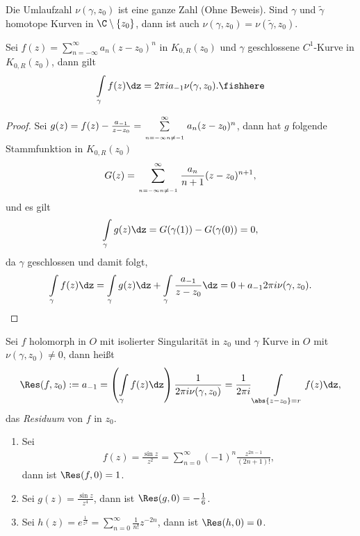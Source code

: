 \begin{bem}
\label{bem:2.87}
Die Umlaufzahl $\nu(\gamma,z_0)$ ist eine ganze Zahl (Ohne Beweis). Sind
$\gamma$ und $\tilde{\gamma}$ homotope Kurven in $\C\setminus\{z_0\}$, dann ist
auch $\nu(\gamma,z_0)=\nu(\tilde{\gamma},z_0)$.\maphere
\end{bem}

\begin{prop}
\label{prop:2.88}
Sei $f(z)=\sum\limits_{n=-\infty}^\infty a_n (z-z_0)^n$ in $K_{0,R}(z_0)$ und
$\gamma$ geschlossene $C^1$-Kurve in $K_{0,R}(z_0)$, dann gilt
\begin{align*}
\int\limits_\gamma f(z)\dz = 2\pi i a_{-1} \nu(\gamma,z_0).\fishhere
\end{align*}
\end{prop}
\begin{proof}
Sei $g(z) = f(z) - \frac{a_{-1}}{z-z_0} =
\sum\limits_{\atop{n=-\infty}{n\neq -1}}^\infty a_n (z-z_0)^n$,
dann hat $g$ folgende Stammfunktion in $K_{0,R}(z_0)$
\begin{align*}
G(z) = \sum\limits_{\atop{n=-\infty}{n\neq -1}}^\infty \frac{a_n}{n+1}
(z-z_0)^{n+1},
\end{align*}
und es gilt
\begin{align*}
\int\limits_\gamma g(z) \dz = G(\gamma(1)) - G(\gamma(0)) = 0,
\end{align*}
da $\gamma$ geschlossen und damit folgt,
\begin{align*}
\int\limits_\gamma f(z)\dz = \int\limits_\gamma g(z)\dz + \int\limits_\gamma
\frac{a_{-1}}{z-z_0}\dz = 0 + a_{-1}2\pi i \nu(\gamma,z_0).\qedhere
\end{align*}
\end{proof}
\begin{defn}
\label{defn:2.89}
Sei $f$ holomorph in $O$ mit isolierter Singularität in $z_0$ und $\gamma$
Kurve in $O$ mit $\nu(\gamma,z_0)\neq 0$, dann heißt
\begin{align*}
\Res(f,z_0) := a_{-1} = \left(\int\limits_\gamma f(z)\dz \right)\frac{1}{2\pi i
\nu(\gamma,z_0)} = \frac{1}{2\pi i}\int\limits_{\abs{z-z_0}=r}f(z)\dz,
\end{align*}
das \emph{Residuum} von $f$ in $z_0$.\fishhere
\end{defn}
\begin{bsp}
\label{bsp:2.90}
\begin{enumerate}
  \item Sei 
\begin{align*}
f(z) = \frac{\sin z}{z^2} = \sum\limits_{n=0}^\infty (-1)^n
\frac{z^{2n-1}}{(2n+1)!},
\end{align*}
dann ist $\Res(f,0) = 1$.
\item Sei $g(z) = \frac{\sin z}{z^4}$, dann ist $\Res(g,0) = -\frac{1}{6}$.
\item Sei $h(z) = e^{\frac{1}{z^2}} = \sum\limits_{n=0}^\infty \frac{1}{n!}
z^{-2n}$, dann ist $\Res(h,0) = 0$.\bsphere
\end{enumerate}
\end{bsp}

